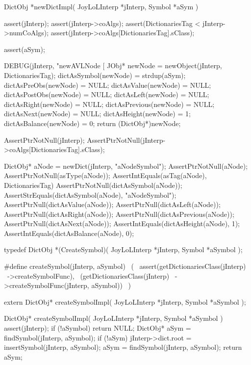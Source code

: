 DictObj *newDictImpl(
  JoyLoLInterp *jInterp,
  Symbol *aSym
) {
  assert(jInterp);
  assert(jInterp->coAlgs);
  assert(DictionariesTag < jInterp->numCoAlgs);
  assert(jInterp->coAlgs[DictionariesTag].sClass);
  
  assert(aSym);
  
  DEBUG(jInterp, "newAVLNode [%
  JObj* newNode   = newObject(jInterp, DictionariesTag);
  dictAsSymbol(newNode)   = strdup(aSym);
  dictAsPreObs(newNode)   = NULL;
  dictAsValue(newNode)    = NULL;
  dictAsPostObs(newNode)  = NULL;
  dictAsLeft(newNode)     = NULL;
  dictAsRight(newNode)    = NULL;
  dictAsPrevious(newNode) = NULL;
  dictAsNext(newNode)     = NULL;
  dictAsHeight(newNode)   = 1;
  dictAsBalance(newNode)  = 0;
  return (DictObj*)newNode;
}
\stopCCode


\startCTest
  AssertPtrNotNull(jInterp);
  AssertPtrNotNull(jInterp->coAlgs[DictionariesTag].sClass);

  DictObj* aNode = newDict(jInterp, "aNodeSymbol");
  AssertPtrNotNull(aNode);
  AssertPtrNotNull(asType(aNode));
  AssertIntEquals(asTag(aNode), DictionariesTag)
  AssertPtrNotNull(dictAsSymbol(aNode));
  AssertStrEquals(dictAsSymbol(aNode), "aNodeSymbol");
  AssertPtrNull(dictAsValue(aNode));
  AssertPtrNull(dictAsLeft(aNode));
  AssertPtrNull(dictAsRight(aNode));
  AssertPtrNull(dictAsPrevious(aNode));
  AssertPtrNull(dictAsNext(aNode));
  AssertIntEquals(dictAsHeight(aNode), 1);
  AssertIntEquals(dictAsBalance(aNode), 0);
\stopCTest
\stopTestCase
\stopTestSuite

\startTestSuite[createSymbol]

\startCHeader
typedef DictObj *(CreateSymbol)(
  JoyLoLInterp *jInterp,
  Symbol       *aSymbol
);

#define createSymbol(jInterp, aSymbol)      \
  (                                         \
    assert(getDictionariesClass(jInterp)    \
      ->createSymbolFunc),                  \
    (getDictionariesClass(jInterp)          \
      ->createSymbolFunc(jInterp, aSymbol)) \
  )
\stopCHeader

\setCHeaderStream{private}
\startCHeader
extern DictObj* createSymbolImpl(
  JoyLoLInterp *jInterp,
  Symbol       *aSymbol
);
\stopCHeader
{}

\startCCode
DictObj* createSymbolImpl(
  JoyLoLInterp *jInterp,
  Symbol       *aSymbol
) {
  assert(jInterp);
  if (!aSymbol) return NULL;
  DictObj* aSym = findSymbol(jInterp, aSymbol);
  if (!aSym) {
    jInterp->dict.root = insertSymbol(jInterp, aSymbol);
    aSym = findSymbol(jInterp, aSymbol);
  }
  return aSym;
}
\stopCCode
\stopTestSuite

